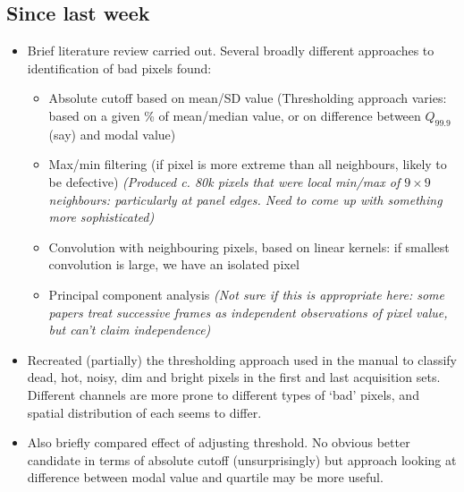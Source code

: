 \documentclass[10pt,fleqn]{article}
\begin{document}
\subsection*{Since last week}

\begin{itemize}

\item
Brief literature review carried out. Several broadly different approaches to identification of bad pixels found:

\begin{itemize}

\item Absolute cutoff based on mean/SD value (Thresholding approach varies: based on a given \% of mean/median value, or on difference between $Q_{99.9}$ (say) and modal value)

\item Max/min filtering (if pixel is more extreme than all neighbours, likely to be defective) \textit{(Produced c. 80k pixels that were local min/max of $9 \times 9$ neighbours: particularly at panel edges. Need to come up with something more sophisticated)}

\item Convolution with neighbouring pixels, based on linear kernels: if smallest convolution is large, we have an isolated pixel

\item Principal component analysis \textit{(Not sure if this is appropriate here: some papers treat successive frames as independent observations of pixel value, but can't claim independence)} 

\end{itemize}

\item
Recreated (partially) the thresholding approach used in the manual to classify dead, hot, noisy, dim and bright pixels in the first and last acquisition sets. Different channels are more prone to different types of `bad' pixels, and spatial distribution of each seems to differ.

\item
Also briefly compared effect of adjusting threshold. No obvious better candidate in terms of absolute cutoff (unsurprisingly) but approach looking at difference between modal value and quartile may be more useful.
\end{itemize}
\end{document}
